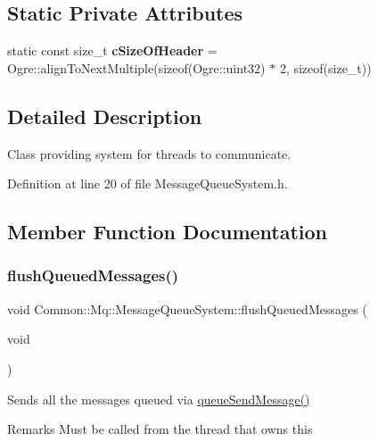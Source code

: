 \subsection*{Static Private Attributes}
\begin{DoxyCompactItemize}
\item 
\mbox{\label{class_common_1_1_mq_1_1_message_queue_system_af72809ed23d11daf72afd93fd34f394e}} 
static const size\+\_\+t {\bfseries c\+Size\+Of\+Header} = Ogre\+::align\+To\+Next\+Multiple(sizeof(Ogre\+::uint32) $\ast$ 2, sizeof(size\+\_\+t))
\end{DoxyCompactItemize}


\subsection{Detailed Description}
Class providing system for threads to communicate. 

Definition at line 20 of file Message\+Queue\+System.\+h.



\subsection{Member Function Documentation}
\mbox{\label{class_common_1_1_mq_1_1_message_queue_system_a6294a354a094e6ae8fc53e6b936d1963}} 
\subsubsection{\texorpdfstring{flush\+Queued\+Messages()}{flushQueuedMessages()}}
{\footnotesize\ttfamily void Common\+::\+Mq\+::\+Message\+Queue\+System\+::flush\+Queued\+Messages (\begin{DoxyParamCaption}\item[{void}]{ }\end{DoxyParamCaption})\hspace{0.3cm}{\ttfamily [inline]}}

Sends all the messages queued via \hyperlink{class_common_1_1_mq_1_1_message_queue_system_ab9a6196ad22221175ec636ea2b08ec5d}{queue\+Send\+Message()} \begin{DoxyRemark}{Remarks}
Must be called from the thread that owns \textquotesingle{}this\textquotesingle{} 
\end{DoxyRemark}


